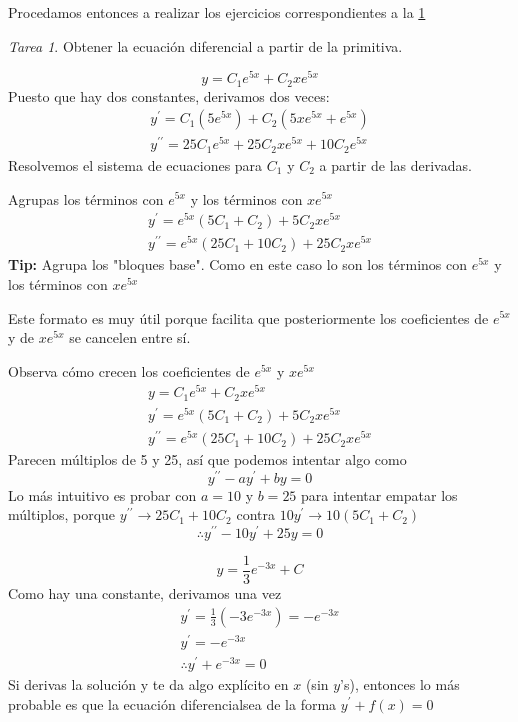\documentclass[12pt]{article} %
\theoremstyle{remark} %
\newtheorem{tarea}{Tarea}[section] %
\newcounter{ejercicio}[tarea]
\newcommand{\ed}{ecuación diferencial}
\begin{document}
Procedamos entonces a realizar los ejercicios correspondientes a la \cref{tarea:Primitivas}
\begin{tarea}
  \label{tarea:Primitivas}
  Obtener la ecuación diferencial a partir de la primitiva.

  \begin{ejercicio}[1]
    \label{ejercicio:primitivas:guess}
  \[ y = C_1 e^{5x} + C_2 xe^{5x} \]
  Puesto que hay dos constantes, derivamos dos veces:
  \begin{gather*}
    y^{\prime} = C_1 (5e^{5x}) + C_2 (5xe^{5x} + e^{5x})\\[0.5em]
    y^{\prime \prime} = 25C_1e^{5x} + 25C_2xe^{5x} + 10C_2e^{5x}
  \end{gather*}
  Resolvemos el sistema de ecuaciones para $C_1$ y $C_2$ a partir de las derivadas.

  Agrupas los términos con $e^{5x}$ y los términos con $xe^{5x}$
  \begin{gather*}
    y^{\prime} = e^{5x} (5C_1 + C_2) + 5C_2xe^{5x}\\[0.5em]
    y^{\prime \prime} = e^{5x}(25C_1 + 10C_2) + 25C_2xe^{5x}
  \end{gather*}
  \textbf{Tip:} Agrupa los "bloques base". Como en este caso lo son los términos con $e^{5x}$ y los términos con $xe^{5x}$

  Este formato es muy útil porque facilita que posteriormente los coeficientes de $e^{5x}$ y de $xe^{5x}$ se cancelen entre sí.

  Observa cómo crecen los coeficientes de $e^{5x}$ y $xe^{5x}$
  \begin{gather*}
    y = C_1e^{5x} + C_2xe^{5x}\\
    y^{\prime} = e^{5x} (5C_1 + C_2) + 5 C_2 xe^{5x}\\[0.5em]
    y^{\prime \prime} = e^{5x} (25C_1 + 10C_2) + 25C_2xe^{5x}
  \end{gather*}
  Parecen múltiplos de 5 y 25, así que podemos intentar algo como \[ y^{\prime \prime} - ay^{\prime} + by = 0 \]
  Lo más intuitivo es probar con $a = 10$ y $b = 25$ para intentar empatar los múltiplos, porque 
  $y^{\prime \prime} \rightarrow 25C_1 + 10C_2$ contra $10y^{\prime} \rightarrow 10(5C_1 + C_2)$
  \[ \therefore y^{\prime \prime} - 10y^{\prime} + 25y = 0 \]
  \end{ejercicio}
  \begin{ejercicio}[2]
    \[ y = \frac{1}{3} e^{-3x} + C \]
    Como hay una constante, derivamos una vez
    \begin{gather*}
      y^{\prime} = \frac{1}{3} (-3e^{-3x}) = -e^{-3x}\\
      y^{\prime} = -e^{-3x}\\
      \therefore y^{\prime} + e^{-3x} = 0
    \end{gather*}
    Si derivas la solución y te da algo explícito en $x$ (sin $y$'s), entonces lo más probable es que la \ed sea 
    de la forma $y^{\prime} + f(x) = 0$
  \end{ejercicio}
  

\end{tarea}
\end{document}
